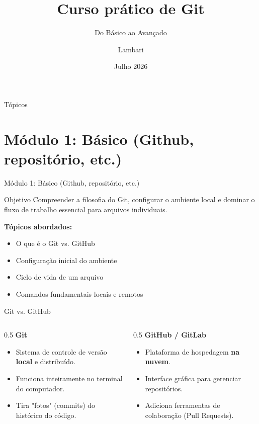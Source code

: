 \documentclass[10pt,aspectratio=169]{beamer}
\title[Curso de Git - Imperador]{Curso prático de Git}
\subtitle{Do Básico ao Avançado}
\author{Lambari}
\institute{Equipe Imperador - UTFPR Curitiba}
\date{Julho 2026}
\begin{document}
\begin{frame}
    \titlepage
\end{frame}

\begin{frame}{Tópicos}
    \tableofcontents
\end{frame}

\section{Módulo 1: Básico (Github, repositório, etc.)}

\begin{frame}{Módulo 1: Básico (Github, repositório, etc.)}
    \begin{block}{Objetivo}
        Compreender a filosofia do Git, configurar o ambiente local e dominar o fluxo de trabalho essencial para arquivos individuais.
    \end{block}
    \vspace{0.5cm}
    \textbf{Tópicos abordados:}
    \begin{itemize}
        \item O que é o Git vs. GitHub
        \item Configuração inicial do ambiente
        \item Ciclo de vida de um arquivo
        \item Comandos fundamentais locais e remotos
    \end{itemize}
\end{frame}

\begin{frame}[fragile]{Git vs. GitHub}
    \begin{columns}
        \begin{column}{0.5\textwidth}
            \textbf{Git}
            \begin{itemize}
                \item Sistema de controle de versão \textbf{local} e distribuído.
                \item Funciona inteiramente no terminal do computador.
                \item Tira "fotos" (commits) do histórico do código.
            \end{itemize}
        \end{column}
        \begin{column}{0.5\textwidth}
            \textbf{GitHub / GitLab}
            \begin{itemize}
                \item Plataforma de hospedagem \textbf{na nuvem}.
                \item Interface gráfica para gerenciar repositórios.
                \item Adiciona ferramentas de colaboração (Pull Requests).
            \end{itemize}
        \end{column}
    \end{columns}
\end{frame}
\end{document}
